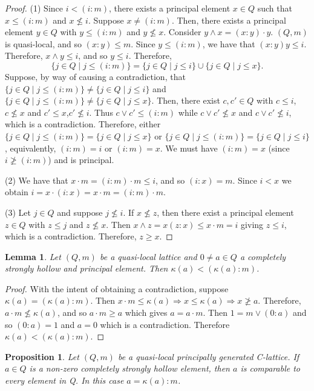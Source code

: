 \documentclass[11pt,english]{amsart}
\newtheorem{proposition}[theorem]{Proposition}
\newtheorem{lemma}[theorem]{Lemma}
\theoremstyle{definition}
\numberwithin{equation}{section}
\theoremstyle{remark}
\def\leq{\leqslant}
\begin{document}
	\begin{proof}
		(1) Since $i<(i:m)$, there exists a principal element $x\in Q$ such that $x\leq (i:m)$ and $x\nleq i$. Suppose $x\neq (i:m)$. Then, there exists a principal element $y\in Q$ with $y\leq (i:m)$ and $y\nleq x$. Consider \(y\wedge x= (x:y)\cdot y\). $(Q,m)$ is quasi-local, and so $(x:y)\leq m$. Since $y\leq (i:m)$, we have that $(x:y)y\leq i$. Therefore, \(x\wedge y \leq i\), and so $y\leq i$. Therefore, \[\{j\in Q \mid j\leq (i:m)\}=\{j\in Q\mid  j\leq i\}\cup\{j\in Q\mid j\leq x\}.\] Suppose, by way of causing a contradiction, that $\{j\in Q \mid j\leq (i:m)\}\neq \{j\in Q\mid j\leq i\}$ and $\{j\in Q \mid j\leq (i:m)\}\neq \{j\in Q\mid j\leq x\}$. Then, there exist $c,c'\in Q$ with $c\leq i$,$c\nleq x$ and $c'\leq x$,$c'\nleq i$. Thus $c\vee c' \leq (i:m)$ while $c\vee c'\nleq x$ and $c\vee c'\nleq i$, which is a contradiction. Therefore, either $\{j\in Q \mid j\leq (i:m)\}=\{j\in Q\mid j\leq x\}$ or $\{j\in Q \mid j\leq (i:m)\}=\{j\in Q \mid j\leq i\}$, equivalently, $(i:m)=i$ or $(i:m)=x$. We must have $(i:m)=x$ (since $i\ngeq (i:m)$) and is principal. 
		
		(2) We have that $x\cdot m=(i:m)\cdot m\leq i$, and so $(i:x)=m$. Since $i<x$ we obtain $i=x\cdot(i:x)=x\cdot m=(i:m)\cdot m$. 
		
		(3) Let $j\in Q$ and suppose $j\nleq i$. If $x\nleq z$, then there exist a principal element $z\in Q$ with $z\leq j$ and $z\nleq x$. Then $x\wedge z=x(z:x)\leq x\cdot m=i$ giving $z\leq i$, which is a contradiction. Therefore, $z\geqslant x$.
	\end{proof}

	\begin{lemma}\label{2}
		Let $(Q,m)$ be a quasi-local lattice and $0\neq a\in Q$ a completely strongly hollow and principal element. Then $\kappa(a)<(\kappa(a):m)$.
	\end{lemma}

	\begin{proof}
		With the intent of obtaining a contradiction, suppose \(\kappa(a) = (\kappa(a):m)\). Then $x\cdot m\leq \kappa(a) \Rightarrow x\leq \kappa(a) \Rightarrow x\ngeq a$. Therefore, $a\cdot m\nleq \kappa(a)$, and so $a\cdot m\geq a$ which gives $a=a\cdot m$. Then $1=m\vee(0:a)$ and so $(0:a)=1$ and $a=0$ which is a contradiction. Therefore $\kappa(a)<(\kappa(a):m)$.
	\end{proof}
	
	\begin{proposition}\label{3}
		Let $(Q,m)$ be a quasi-local principally generated C-lattice. If $a\in Q$ is a non-zero completely strongly hollow element, then $a$ is comparable to every element in Q. In this case $a=\kappa(a):m$.
	\end{proposition}
\end{document}
